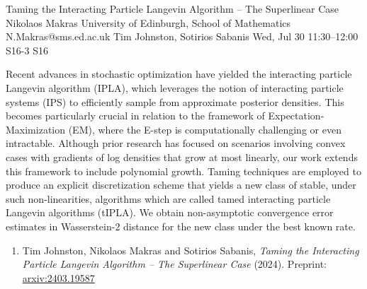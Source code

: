 \documentclass[12pt,lettersize,oneside]{book} %
\begin{document}
\begin{talk}
  {Taming the Interacting Particle Langevin Algorithm -- The Superlinear Case}%
  {Nikolaos Makras}%
  {University of Edinburgh, School of Mathematics}%
  {N.Makras@sms.ed.ac.uk}%
  {Tim Johnston, Sotirios Sabanis}%
  {}%
  {Wed, Jul 30 11:30--12:00}%
  {S16-3}%
  {S16}%
  
    
   
Recent advances in stochastic optimization have yielded the interacting particle Langevin algorithm (IPLA), which leverages the notion of interacting particle systems (IPS) to efficiently sample from approximate posterior densities. This becomes particularly crucial in relation to the framework of Expectation-Maximization (EM), where the E-step is computationally challenging or even intractable. Although prior research has focused on scenarios involving convex cases with gradients of log densities that grow at most linearly, our work extends this framework to include polynomial growth. Taming techniques are employed to produce an explicit discretization scheme that yields a new class of stable, under such non-linearities, algorithms which are called tamed interacting particle Langevin algorithms (tIPLA). We obtain non-asymptotic convergence error estimates in Wasserstein-2 distance for the new class under the best known rate. 

\medskip

\begin{enumerate}
 \item[{[1]}] Tim Johnston, Nikolaos Makras and Sotirios Sabanis, {\it Taming the Interacting Particle Langevin Algorithm -- The Superlinear Case} (2024). Preprint: \href{https://arxiv.org/abs/2403.19587}{arxiv:2403.19587} 
\end{enumerate}

\end{talk}
\end{document}
